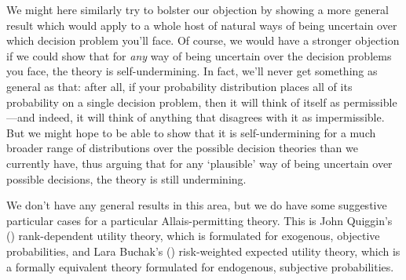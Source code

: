 \documentclass[a4paper]{article}
\renewcommand{\color}[1]{}
\newenvironment{CCM rewritten}
{\begingroup\color{blue}} %
{\endgroup}              %
\begin{document}
%

We might here similarly try to bolster our objection by showing a more general result which would apply to a whole host of natural ways of being uncertain over which decision problem you'll face. 
Of course, we would have a stronger objection if we could show that for \textit{any} way of being uncertain over the decision problems you face, the theory is self-undermining. In fact, we'll never get something as general as that: after all, if your probability distribution places all of its probability on a single decision problem, then it will think of itself as permissible---and indeed, it will think of anything that disagrees with it as impermissible. But we might hope to be able to show that it is self-undermining for a much broader range of distributions over the possible decision theories than we currently have, thus arguing that for any `plausible' way of being uncertain over possible decisions, the theory is still undermining. 


We don't have any general results in this area, but we do have some suggestive particular cases for a particular Allais-permitting theory. This is John Quiggin's (\citeyear{quiggin1982tau,quiggin1993geut}) rank-dependent utility theory, which is formulated for exogenous, objective probabilities, and Lara Buchak's (\citeyear{buchak2014rr}) risk-weighted expected utility theory, which is a formally equivalent theory formulated for endogenous, subjective probabilities.
\end{document}
